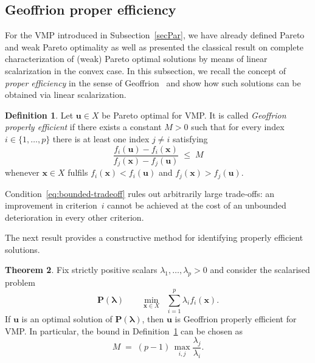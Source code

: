 \documentclass{article}
\theoremstyle{definition}
\newtheorem{maar}{Definition}[section]
\newtheorem{theorem}[maar]{Theorem}
\begin{document}
\subsection{Geoffrion proper efficiency}\label{sec:geoffrion}

For the VMP introduced in Subsection~\ref{secPar}, we have already defined Pareto and weak Pareto optimality as well as presented the classical result on complete characterization of (weak) Pareto optimal solutions by means of linear scalarization in the convex case. In this subsection, we recall the concept of \emph{proper efficiency} in the sense of Geoffrion~\cite{Geoffrion} and show how such solutions can be obtained via linear scalarization.

\begin{maar}\cite{Geoffrion}\label{def:geo-proper}
Let $\boldsymbol{u}\in X$ be Pareto optimal for VMP. It is called \emph{Geoffrion properly efficient} if there exists a constant $M>0$ such that for every index $i\in\{1,\dots,p\}$ there is at least one index $j\neq i$ satisfying
\begin{equation}\label{eq:bounded-tradeoff}
  \frac{f_i(\boldsymbol u)-f_i(\boldsymbol x)}{f_j(\boldsymbol x)-f_j(\boldsymbol u)}\;\le\; M
\end{equation}
whenever $\boldsymbol x\in X$ fulfils $f_i(\boldsymbol x)<f_i(\boldsymbol u)$ and $f_j(\boldsymbol x)>f_j(\boldsymbol u)$.
\end{maar}

Condition~\eqref{eq:bounded-tradeoff} rules out arbitrarily large trade‑offs: an improvement in criterion~$i$ cannot be achieved at the cost of an unbounded deterioration in every other criterion.

The next result provides a constructive method for identifying properly efficient solutions.

\begin{theorem}\cite{Geoffrion}\label{thm:geo}
Fix strictly positive scalars $\lambda_1,\dots,\lambda_p>0$ and consider the scalarised problem
\[
  \boldsymbol{P}(\boldsymbol\lambda)\qquad
  \min_{\boldsymbol x\in X}\;\; \sum_{i=1}^{p}\lambda_i f_i(\boldsymbol x).
\]
If $\boldsymbol u$ is an optimal solution of $\boldsymbol{P}(\boldsymbol\lambda)$, then $\boldsymbol u$ is Geoffrion properly efficient for VMP. In particular, the bound in Definition~\ref{def:geo-proper} can be chosen as
\[
  M\;=\;(p-1)\,\max_{i,j}\frac{\lambda_j}{\lambda_i}.
\]
\end{theorem}
\end{document}
